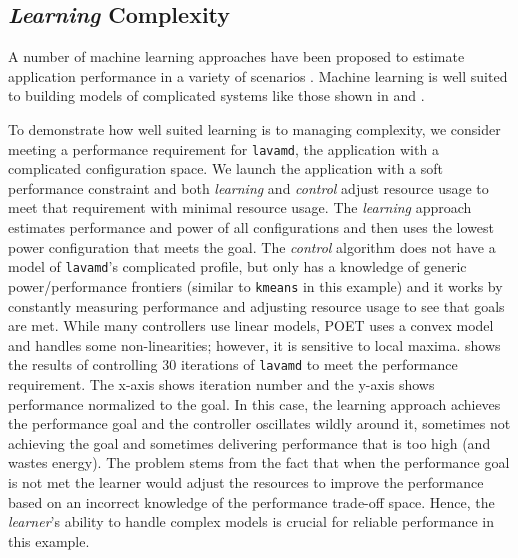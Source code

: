 \subsection{\emph{Learning} Complexity}
A number of machine learning approaches have been proposed to estimate
application performance in a variety of scenarios
\cite{reddiHPCA2013,LeeBrooks2006,CPR,ParallelismDial,Flicker,LeeBrooks,Koala}.
Machine learning is well suited to building models of complicated
systems like those shown in  and
 .

To demonstrate how well suited learning is to managing complexity, we
consider meeting a performance requirement for \texttt{lavamd}, the
application with a complicated configuration space.  We launch the
application with a soft performance constraint and both
\emph{learning} and \emph{control} adjust resource usage to meet that
requirement with minimal resource usage.  The \emph{learning} approach
estimates performance and power of all configurations and then uses
the lowest power configuration that meets the goal.  The
\emph{control} algorithm does not have a model of \texttt{lavamd}'s
complicated profile, but only has a knowledge of generic
power/performance frontiers (similar to \texttt{kmeans} in this
example) and it works by constantly measuring performance and
adjusting resource usage to see that goals are met.  While many
controllers use linear models, POET uses a convex model and handles
some non-linearities; however, it is sensitive to local maxima.
  shows the results of controlling 30
iterations of \texttt{lavamd} to meet the performance requirement.
The x-axis shows iteration number and the y-axis shows performance
normalized to the
goal.  %
In this case, the learning approach achieves the performance goal and
the controller oscillates wildly around it, sometimes not achieving
the goal and sometimes delivering performance that is too high (and
wastes energy). The problem stems from the fact that when the
performance goal is not met the learner would adjust the resources to
improve the performance based on an incorrect knowledge of the
performance trade-off space. Hence, the \emph{learner}'s ability to
handle complex models is crucial for reliable performance in this
example.

